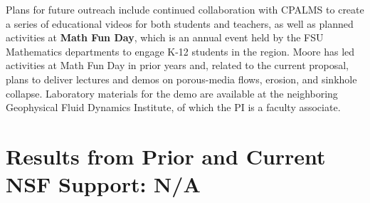 \documentclass[11pt]{article}
\begin{document}
Plans for future outreach include continued collaboration with CPALMS to create a series of educational videos for both students and teachers, as well as planned activities at {\bf Math Fun Day}, which is an annual event held by the FSU Mathematics departments to engage K-12 students in the region. Moore has led activities at Math Fun Day in prior years and, related to the current proposal, plans to deliver lectures and demos on porous-media flows, erosion, and sinkhole collapse.
Laboratory materials for the demo are available at the neighboring Geophysical Fluid Dynamics Institute, of which the PI is a faculty associate.

\section{Results from Prior and Current NSF Support: N/A}


\newpage
\setcounter{page}{1}

%

\end{document}
